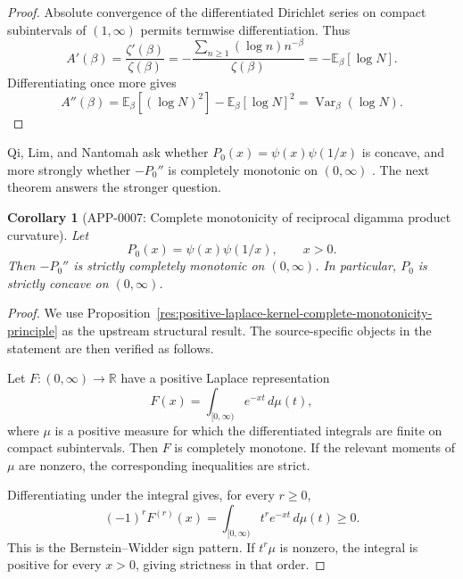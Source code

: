 \documentclass[11pt]{article}
\numberwithin{equation}{section}
\newtheorem{corollary}[theorem]{Corollary}
\theoremstyle{definition}
\theoremstyle{remark}
\DeclareMathOperator{\Var}{Var}
\newcommand{\E}{\mathbb E}
\newcommand{\1}{\mathbf 1}
\begin{document}
\begin{proof}
Absolute convergence of the differentiated Dirichlet series on compact subintervals of \((1,\infty)\) permits termwise differentiation.  Thus
\begin{equation}
\label{eq:first-free-derivative-proof}
A'(\beta)=\frac{\zeta'(\beta)}{\zeta(\beta)}
=-\frac{\sum_{n\ge1}(\log n)n^{-\beta}}{\zeta(\beta)}
=-\E_\beta[\log N].
\end{equation}
Differentiating once more gives
\begin{equation}
\label{eq:second-free-derivative-proof}
A''(\beta)=\E_\beta[(\log N)^2]-\E_\beta[\log N]^2
=\Var_\beta(\log N).
\end{equation}
\end{proof}

Qi, Lim, and Nantomah ask whether \(P_0(x)=\psi(x)\psi(1/x)\) is concave, and more strongly whether \(-P_0''\) is completely monotonic on \((0,\infty)\) \cite{qi-lim-nantomah-polygamma}.  The next theorem answers the stronger question.

\begin{corollary}[APP-0007: Complete monotonicity of reciprocal digamma product curvature]
\label{thm:reciprocal-digamma-product-complete-monotonicity}
Let
\begin{equation}
\label{eq:reciprocal-digamma-p0}
P_0(x)=\psi(x)\psi(1/x),\qquad x>0.
\end{equation}
Then \(-P_0''\) is strictly completely monotonic on \((0,\infty)\).  In particular, \(P_0\) is strictly concave on \((0,\infty)\).


\end{corollary}

\begin{proof}
We use Proposition~\ref{res:positive-laplace-kernel-complete-monotonicity-principle} as the upstream structural result. The source-specific objects in the statement are then verified as follows.

Let \(F:(0,\infty)\to\mathbb R\) have a positive Laplace representation
\[
F(x)=\int_{[0,\infty)}e^{-xt}\,d\mu(t),
\]
where \(\mu\) is a positive measure for which the differentiated integrals are finite on compact subintervals. Then \(F\) is completely monotone. If the relevant moments of \(\mu\) are nonzero, the corresponding inequalities are strict.

Differentiating under the integral gives, for every \(r\ge0\),
\[
(-1)^rF^{(r)}(x)=\int_{[0,\infty)}t^r e^{-xt}\,d\mu(t)\ge0.
\]
This is the Bernstein--Widder sign pattern. If \(t^r\mu\) is nonzero, the integral is positive for every \(x>0\), giving strictness in that order.
\end{proof}
\end{document}
